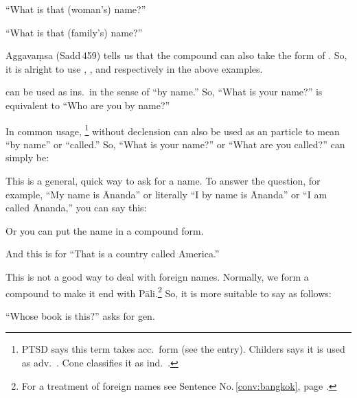 ``What is that (woman's) name?''


``What is that (family's) name?''


Aggava\d msa (Sadd\,459) tells us that the compound can also take the form of . So, it is alright to use , , and  respectively in the above examples.

 can be used as ins.\ in the sense of ``by name.'' So, ``What is your name?'' is equivalent to ``Who are you by name?''


In common usage, \footnote{PTSD says this term takes acc.\ form (see the entry). Childers says it is used as adv.\ \citep[p.~257]{childers:dict}. Cone classifies it as ind.\ \citep[p.~526]{cone:dict2}.} without declension can also be used as an particle to mean ``by name'' or ``called.'' So, ``What is your name?'' or ``What are you called?'' can simply be:


This is a general, quick way to ask for a name. To answer the question, for example, ``My name is \=Ananda'' or literally ``I by name is \=Ananda'' or ``I am called \=Ananda,'' you can say this:


Or you can put the name in a compound form.


And this is for ``That is a country called America.''


This is not a good way to deal with foreign names. Normally, we form a compound to make it end with P\=ali.\footnote{For a treatment of foreign names see Sentence No.\,\ref{conv:bangkok}, page \pageref{conv:bangkok}.} So, it is more suitable to say as follows:


``Whose book is this?'' asks for gen.



